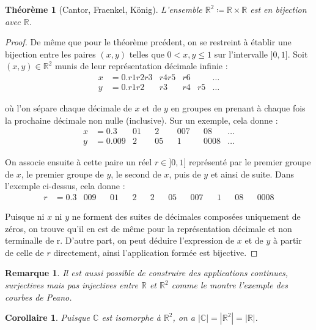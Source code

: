 \documentclass[french]{article}
\theoremstyle{definition}
\theoremstyle{plain}
\newtheorem{theorem}[subsubsection]{Théorème}
\theoremstyle{plain}
\newtheorem{corollary}[subsubsection]{Corollaire}
\theoremstyle{plain}
\theoremstyle{plain}
\newtheorem{remark}[subsubsection]{Remarque}
\theoremstyle{plain}
\begin{document}
\begin{theorem}[Cantor, Fraenkel, König]
	L'ensemble \( \mathbb{R}^{2} \coloneqq \mathbb{R} \times \mathbb{R}\) est en bijection avec \( \mathbb{R} \). \cite{aigner2018proofs} 
\end{theorem}
\begin{proof}
	De même que pour le théorème prcédent, on se restreint à établir une bijection entre les paires \( (x,y) \) telles que \( 0 < x,y \le 1 \) sur l'intervalle \( ]0,1] \).
	Soit \( (x,y) \in \mathbb{R}^{2} \) munis de leur représentation décimale infinie :
	\begin{align*}
		x &= 0.r1r2r3 & r4r5 & r6 & &\ldots\\
		y &= 0.r1r2  & r3 & r4 & r5 &\ldots
	\end{align*}

	où l'on sépare chaque décimale de \( x \) et de \( y \) en groupes en prenant à chaque fois la prochaine décimale non nulle (inclusive). Sur un exemple, cela donne :
	\begin{align*}
		x &= 0.3 & 01 && 2 && 007 && 08 & \ldots\\
		y &= 0.009 & 2 && 05 && 1 && 0008 & \ldots
	\end{align*}

	On associe ensuite à cette paire un réel \( r \in ]0,1] \) représenté par le premier groupe de \( x \), le premier groupe de \( y \), le second de \( x \), puis de \( y \) et ainsi de suite.
	Dans l'exemple ci-dessus, cela donne :
	\begin{align*}
		r &= 0.3 & 009 && 01 && 2 && 2 && 05 && 007 && 1 && 08 && 0008
	\end{align*}

	Puisque ni \( x \) ni \( y \) ne forment des suites de décimales composées uniquement de zéros, on trouve qu'il en est de même pour la représentation décimale et non terminalle de r. 
	D'autre part, on peut déduire l'expression de \( x \) et de \( y \) à partir de celle de \( r \) directement, ainsi l'application formée est bijective.
\end{proof}

\begin{remark}
	Il est aussi possible de construire des applications continues, surjectives mais pas injectives entre \( \mathbb{R} \) et \( \mathbb{R}^{2} \) comme le montre l'exemple des courbes de Peano. \cite{peano1890curve}
\end{remark}

\begin{corollary}
	Puisque \( \mathbb{C} \) est isomorphe à \( \mathbb{R}^{2} \), on a \( |\mathbb{C}| = |\mathbb{R}^{2}| = |\mathbb{R}| \).
\end{corollary}
\end{document}
